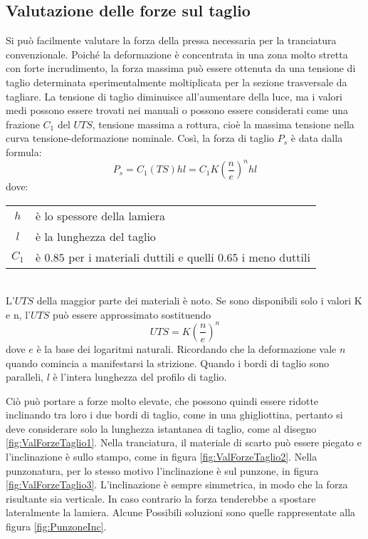 \subsection{Valutazione delle forze sul taglio}
Si può facilmente valutare la forza della pressa necessaria per la tranciatura convenzionale. Poiché la deformazione è concentrata in una zona molto stretta con forte incrudimento, la forza massima può essere ottenuta da una tensione di taglio determinata sperimentalmente moltiplicata per la sezione trasversale da tagliare.
La tensione di taglio diminuisce all'aumentare della luce, ma i valori medi possono essere trovati nei manuali o possono essere considerati come una frazione $C_1$ del $UTS$, tensione massima a rottura, cioè la massima tensione nella curva tensione-deformazione nominale.
Così, la forza di taglio $P_s$ è data dalla formula:
\begin{equation}
P_s = C_1(TS) h l = C_1 K \left(\frac{n}{e}\right)^n hl
\label{eqn:ForzaTaglio}
\end{equation}
dove:\\
\begin{tabular}{cl}
$h$ & è lo spessore della lamiera\\
$l$ & è la lunghezza del taglio\\
$C_1$ & è $0.85$ per i materiali duttili e quelli $0.65$ i meno duttili\\
\end{tabular}\\
L'$UTS$ della maggior parte dei materiali è noto.
Se sono disponibili solo i valori K e n, l'$UTS$ può essere approssimato sostituendo 
\begin{equation}
UTS = K \left(\frac{n}{e} \right)^n
\end{equation}
dove $e$ è la base dei logaritmi naturali. 
Ricordando che la deformazione vale $n$ quando comincia a manifestarsi la strizione.
Quando i bordi di taglio sono paralleli, $l$ è l'intera lunghezza del profilo di taglio.

Ciò può portare a forze molto elevate, che possono quindi essere ridotte inclinando tra loro i due bordi di taglio, come in una ghigliottina, pertanto si deve considerare solo la lunghezza istantanea di taglio, come al disegno \ref{fig:ValForzeTaglio1}.
Nella tranciatura, il materiale di scarto può essere piegato e l'inclinazione è sullo stampo, come in figura \ref{fig:ValForzeTaglio2}. Nella punzonatura, per lo stesso motivo l'inclinazione è sul punzone, in figura \ref{fig:ValForzeTaglio3}. L'inclinazione è sempre simmetrica, in modo che la forza risultante sia verticale. In caso contrario la forza tenderebbe a spostare lateralmente la lamiera.
Alcune Possibili soluzioni sono quelle rappresentate alla figura \ref{fig:PunzoneInc}.

